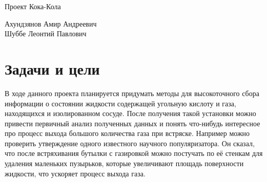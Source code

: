 \documentclass[12pt,a4paper]{scrartcl}
\begin{document}
\begin{center}
\begin{large}
Проект Кока-Кола
\end{large}
	\bigskip
     
Ахундзянов Амир Андреевич\\
Шуббе Леонтий Павлович
\end{center}

\section{Задачи и цели}
В ходе данного проекта планируется придумать методы для высокоточного сбора информации о состоянии жидкости  содержащей угольную кислоту и газа, находящихся и изолированном сосуде. После получения такой установки можно привести первичный анализ полученных данных и понять что-нибудь интересное про процесс выхода большого количества газа при встряске. Например можно проверить утверждение одного известного научного популяризатора. Он сказал, что после встряхивания бутылки с газировкой можно постучать по её стенкам для удаления маленьких пузырьков, которые увеличивают площадь поверхности жидкости, что ускоряет процесс выхода газа.
\end{document}

